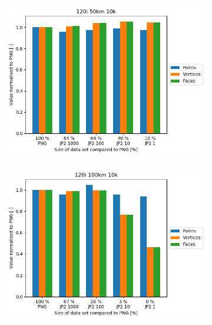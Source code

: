 \begin{figure}[htb]
    \centering
        \begin{subfigure}[b]{0.49\textwidth}
            \centering
            \includegraphics[width=\textwidth]{doc/thesis/0_figures/recon/120i_50km_10k.png}
            \caption{}
            \label{fig:recon_120_50_10}
        \end{subfigure}
        \begin{subfigure}[b]{0.49\textwidth}
            \centering
            \includegraphics[width=\textwidth]{doc/thesis/0_figures/recon/120i_100km_10k.png}
            \caption{}
            \label{fig:recon_120_100_10}
        \end{subfigure}
        \\

\end{figure}
